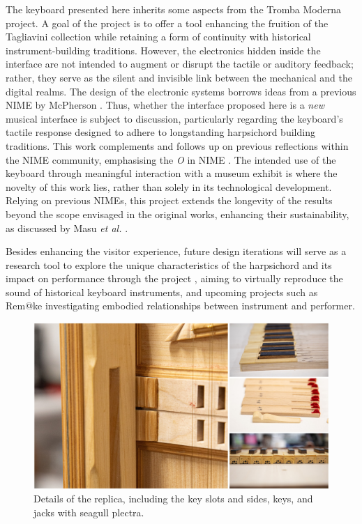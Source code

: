 The keyboard presented here inherits some aspects from the Tromba Moderna project. A goal of the project is to offer a tool enhancing the fruition of the Tagliavini collection while retaining a form of continuity with historical instrument-building traditions. However, the electronics hidden inside the interface are not intended to augment or disrupt the tactile or auditory feedback; rather, they serve as the silent and invisible link between the mechanical and the digital realms. The design of the electronic systems borrows ideas from a previous NIME by McPherson \cite{McPherson2013}. Thus, whether the interface proposed here is a \emph{new} musical interface is subject to discussion, particularly regarding the keyboard's tactile response designed to adhere to longstanding harpsichord building traditions. This work complements and follows up on previous reflections within the NIME community, emphasising the \emph{O} in NIME \cite{Masu_NIME_2023}. The intended use of the keyboard through meaningful interaction with a museum exhibit is where the novelty of this work lies, rather than solely in its technological development. Relying on previous NIMEs, this project extends the longevity of the results beyond the scope envisaged in the original works, enhancing their sustainability, as discussed by Masu \emph{et al.} \cite{Masu_NIME_2023}.

Besides enhancing the visitor experience, future design iterations will serve as a research tool to explore the unique characteristics of the harpsichord and its impact on performance through the  project \cite{NEMUS}, aiming to virtually reproduce the sound of historical keyboard instruments, and upcoming projects such as Rem@ke \cite{remake1} investigating embodied relationships between instrument and performer.

\begin{figure}
\centering
\includegraphics[width=0.8\linewidth]{src/images/details.jpg}
\caption{Details of the replica, including the key slots and sides, keys, and jacks with seagull plectra.}\label{fig:details}
\end{figure}

